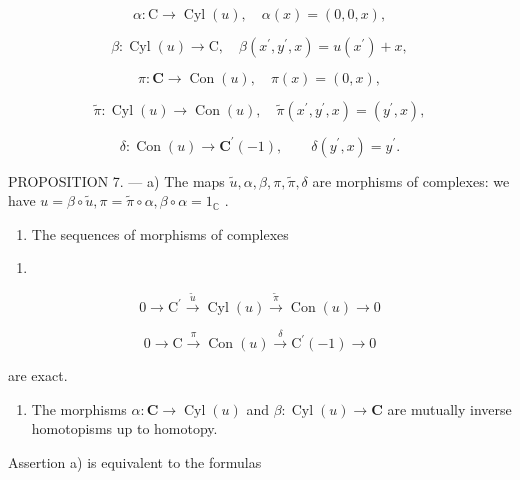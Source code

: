 \[
\alpha : \mathrm{C} \rightarrow \operatorname{Cyl} (u), \quad \alpha (x) = (0, 0, x),
\]

\[
\beta : \operatorname{Cyl} (u) \rightarrow \mathrm{C}, \quad \beta \left(x ^ {\prime}, y ^ {\prime}, x\right) = u \left(x ^ {\prime}\right) + x,
\]

\[
\pi : \mathbf {C} \rightarrow \operatorname{Con} (u), \quad \pi (x) = (0, x),
\]

\[
\tilde {\pi}: \operatorname{Cyl} (u) \to \operatorname{Con} (u), \quad \tilde {\pi} (x ^ {\prime}, y ^ {\prime}, x) = (y ^ {\prime}, x),
\]

\[
\delta : \operatorname{Con} (u) \to \mathbf {C} ^ {\prime} (- 1), \qquad \delta (y ^ {\prime}, x) = y ^ {\prime}.
\]

PROPOSITION 7. --- a) The maps \(\tilde{u}, \alpha, \beta, \pi, \tilde{\pi}, \delta\) are morphisms of complexes: we have \(u = \beta \circ \tilde{u}, \pi = \tilde{\pi} \circ \alpha, \beta \circ \alpha = 1_{\mathbb{C}}\) .

\begin{enumerate}
\def\labelenumi{\alph{enumi})}
\setcounter{enumi}{1}
\tightlist
\item
  The sequences of morphisms of complexes
\end{enumerate}

\begin{enumerate}
\def\labelenumi{(\arabic{enumi})}
\setcounter{enumi}{5}
\tightlist
\item
\end{enumerate}

\[
0 \rightarrow \mathrm{C} ^ {\prime} \stackrel {\tilde {u}} {\rightarrow} \operatorname{Cyl} (u) \stackrel {\tilde {\pi}} {\rightarrow} \operatorname{Con} (u) \rightarrow 0\tag{7}
\]

\[
0 \rightarrow \mathrm{C} \xrightarrow {\pi} \operatorname{Con} (u) \xrightarrow {\delta} \mathrm{C} ^ {\prime} (- 1) \rightarrow 0
\]

are exact.

\begin{enumerate}
\def\labelenumi{\alph{enumi})}
\setcounter{enumi}{2}
\tightlist
\item
  The morphisms \(\alpha : \mathbf{C} \to \operatorname{Cyl}(u)\) and \(\beta : \operatorname{Cyl}(u) \to \mathbf{C}\) are mutually inverse homotopisms up to homotopy.
\end{enumerate}

Assertion a) is equivalent to the formulas

